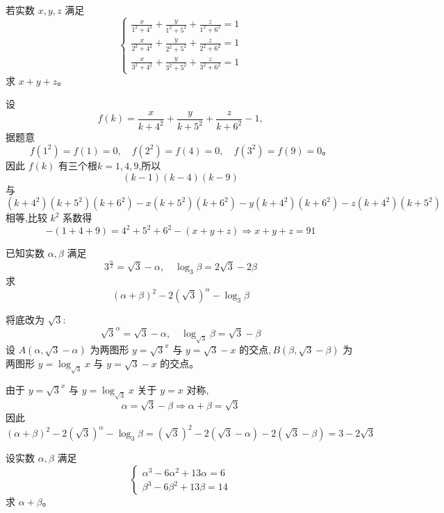 \begin{questions}
    \question 若实数 \(x, y, z\) 满足
    \[
    \begin{cases}
    \displaystyle \frac{x}{1^2 + 4^2} + \frac{y}{1^2 + 5^2} + \frac{z}{1^2 + 6^2} = 1 \\[2mm]
    \displaystyle \frac{x}{2^2 + 4^2} + \frac{y}{2^2 + 5^2} + \frac{z}{2^2 + 6^2} = 1 \\[2mm]
    \displaystyle\frac{x}{3^2 + 4^2} + \frac{y}{3^2 + 5^2} + \frac{z}{3^2 + 6^2} = 1
    \end{cases}
    \]
    求 \(x + y + z\)。
    \begin{solution}
        设
        \[
        f(k) = \frac{x}{k + 4^2} + \frac{y}{k + 5^2} + \frac{z}{k + 6^2} - 1,
        \]
        据题意
        \[
        f(1^2) = f(1) = 0, \quad f(2^2) = f(4) = 0, \quad f(3^2) = f(9) = 0。
        \]
        因此 \(f(k)\) 有三个根\(k = 1, 4, 9\),所以
        \[
        (k - 1)(k - 4)(k - 9)
        \]
        与
        \[
        (k + 4^2)(k + 5^2)(k + 6^2) - x(k + 5^2)(k + 6^2) - y(k + 4^2)(k + 6^2) - z(k + 4^2)(k + 5^2)
        \]
        相等,比较 \(k^2\) 系数得
        \[
        - (1 + 4 + 9) = 4^2 + 5^2 + 6^2 - (x + y + z) \Rightarrow x + y + z = 91
        \]
    \end{solution}

    \question 已知实数 $\alpha,\beta$ 满足
    \[
    3^{\frac{\alpha}{2}} = \sqrt{3} - \alpha, \quad \log_3 \beta = 2\sqrt{3} - 2\beta
    \]
    求
    \[
    (\alpha + \beta)^2 - 2 (\sqrt{3})^\alpha - \log_3 \beta
    \]
    \begin{solution}
        将底改为 $\sqrt{3}$:
        \[
        \sqrt{3}^\alpha = \sqrt{3} - \alpha, \quad \log_{\sqrt{3}} \beta = \sqrt{3} - \beta
        \]
        设 $A(\alpha, \sqrt{3}-\alpha)$ 为两图形 $y = \sqrt{3}^x$ 与 $y = \sqrt{3} - x$ 的交点$,B(\beta, \sqrt{3}-\beta)$ 为两图形 $y = \log_{\sqrt{3}} x$ 与 $y = \sqrt{3}-x$ 的交点。  

        由于 $y = \sqrt{3}^x$ 与 $y = \log_{\sqrt{3}} x$ 关于 $y = x$ 对称,
        \[
        \alpha = \sqrt{3} - \beta \Rightarrow \alpha+\beta = \sqrt{3}
        \]
        因此
        \[
        (\alpha + \beta)^2 - 2 (\sqrt{3})^\alpha - \log_3 \beta = (\sqrt{3})^2 - 2(\sqrt{3}-\alpha) - 2(\sqrt{3}-\beta) = 3 - 2\sqrt{3}
        \]
    \end{solution}

    \question 设实数 $\alpha,\beta$ 满足
    \[
    \begin{cases}
    \alpha^3 - 6\alpha^2 + 13\alpha = 6 \\
    \beta^3 - 6\beta^2 + 13\beta = 14
    \end{cases}
    \]
    求 $\alpha + \beta$。


\end{questions}
